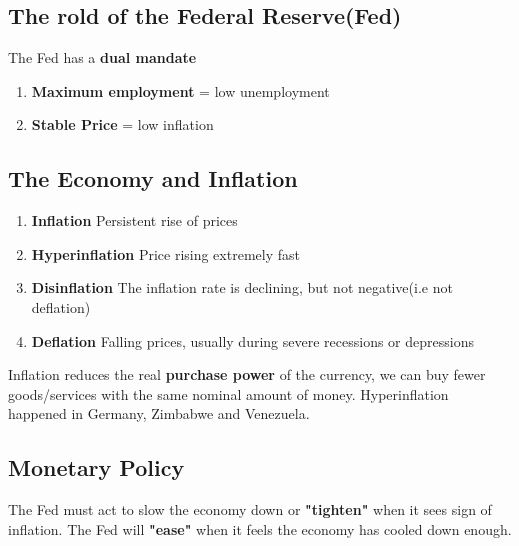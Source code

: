 \documentclass{article}
\theoremstyle{definition}
\theoremstyle{thrm}
\theoremstyle{lma}
\theoremstyle{ppst}
\theoremstyle{crlr}
\begin{document}
\subsection{The rold of the Federal Reserve(Fed)}
The Fed has a \textbf{dual mandate}
\begin{enumerate}
	\item \textbf{Maximum employment} = low unemployment
	\item \textbf{Stable Price} = low inflation
\end{enumerate}

\subsection{The Economy and Inflation}
\begin{enumerate}
	\item \textbf{Inflation} Persistent rise of prices
	\item \textbf{Hyperinflation} Price rising extremely fast
	\item \textbf{Disinflation} The inflation rate is declining, but not negative(i.e not deflation)
	\item \textbf{Deflation} Falling prices, usually during severe recessions or depressions
\end{enumerate}
Inflation reduces the real \textbf{purchase power} of the currency, we can buy fewer goods/services with the same nominal amount of money. Hyperinflation happened in Germany, Zimbabwe and Venezuela.

\subsection{Monetary Policy}
The Fed must act to slow the economy down or \textbf{"tighten"} when it sees sign of inflation. The Fed will \textbf{"ease"} when it feels the economy has cooled down enough.
\end{document}
